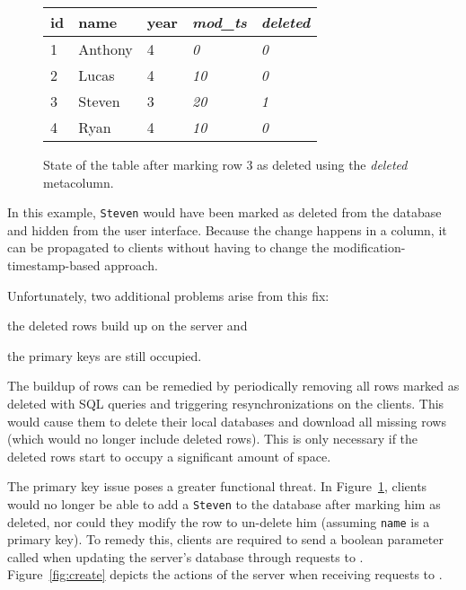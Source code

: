 \begin{figure}[h!]
\center
\begin{tabular}{ l  l  l  l  l}
id  & name      & year  & \textit{mod\_ts} & \textit{deleted} \\ 
\hline
1   & Anthony   & 4     & \textit{0}   & \textit{0}     \\
2   & Lucas     & 4     & \textit{10}   & \textit{0}     \\
3   & Steven    & 3     & \textit{20}   & \textit{1}     \\
4   & Ryan      & 4     & \textit{10}   & \textit{0}     \\
\end{tabular}
\caption{State of the  table after marking row 3 as deleted using
the \textit{deleted} metacolumn.}
\label{fig:new_deleted}
\end{figure}

In this example, \texttt{Steven} would have been marked as deleted from the
database and hidden from the user interface. Because the change happens in a
column, it can be propagated to clients without having to change the
modification-timestamp-based approach.

Unfortunately, two additional problems arise from this fix: 
\begin{inparaenum}
\item the deleted rows build up on the server and
\item the primary keys are still occupied. 
\end{inparaenum}
The buildup of rows can be remedied by periodically removing all rows marked as
deleted with SQL  queries and triggering resynchronizations on the
clients. This would cause them to delete their local databases and download all
missing rows (which would no longer include deleted rows). This is only
necessary if the deleted rows start to occupy a significant amount of space.

The primary key issue poses a greater functional threat. In Figure~\ref{fig:new_deleted}, clients
would no longer be able to add a \texttt{Steven} to the database after marking
him as deleted, nor could they modify the row to un-delete him (assuming
\texttt{name} is a primary key). To remedy this, clients are required to send a
boolean parameter called  when updating the server's
database through requests to \create. Figure~\ref{fig:create} depicts
the actions of the server when receiving requests to \create.


